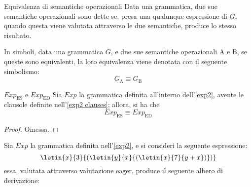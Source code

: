 \documentclass[a4paper, 12pt]{report}
\begin{document}
    \begin{frameddefn}[label={equiv lang}]{Equivalenza di semantiche operazionali}
        Data una grammatica, due sue semantiche operazionali sono dette  se, presa una qualunque espressione di $G$, quando questa viene valutata attraverso le due semantiche, produce lo stesso risultato.

        In simboli, data una grammatica $G$, e due sue semantiche operazionali $\mathrm{A}$ e $\mathrm{B}$, se queste sono equivalenti, la loro equivalenza viene denotata con il seguente simbolismo: $$G_\mathrm{A} \equiv G_\mathrm{B}$$
    \end{frameddefn}

    \begin{framedlem}{$Exp_\mathrm{ES}$ e $Exp_\mathrm{ED}$}
        Sia $Exp$ la grammatica definita all'interno dell'\cref{exp2}, avente le clausole definite nell'\cref{exp2 clauses}; allora, si ha che $$Exp_\mathrm{ES} \equiv Exp_\mathrm{ED}$$
    \end{framedlem}

    \begin{proof}
        Omessa.
    \end{proof}

    \begin{example}
        \label{eager2}
        Sia $Exp$ la grammatica definita nell'\cref{exp2}, e si consideri la seguente espressione: $$\letin{x}{3}{(\letin{y}{x}{(\letin{x}{7}{y + x})})}$$ essa, valutata attraverso valutazione eager, produce il seguente albero di derivazione: 
    \end{example}
\end{document}

